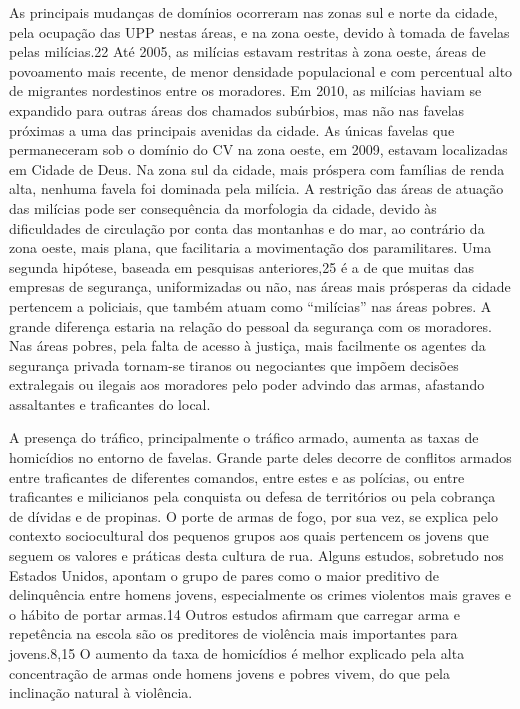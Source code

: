 \documentclass{article}
\begin{document}
As principais mudanças de domínios ocorreram nas zonas sul e norte da cidade,
pela ocupação das UPP nestas áreas, e na zona oeste, devido à tomada de favelas
pelas milícias.22 Até 2005, as milícias estavam restritas à zona oeste, áreas de
povoamento mais recente, de menor densidade populacional e com percentual alto
de migrantes nordestinos entre os moradores. Em 2010, as milícias haviam se
expandido para outras áreas dos chamados subúrbios, mas não nas favelas próximas
a uma das principais avenidas da cidade. As únicas favelas que permaneceram sob
o domínio do CV na zona oeste, em 2009, estavam localizadas em Cidade de Deus.
Na zona sul da cidade, mais próspera com famílias de renda alta, nenhuma favela
foi dominada pela milícia. A restrição das áreas de atuação das milícias pode
ser consequência da morfologia da cidade, devido às dificuldades de circulação
por conta das montanhas e do mar, ao contrário da zona oeste, mais plana, que
facilitaria a movimentação dos paramilitares. Uma segunda hipótese, baseada em
pesquisas anteriores,25 é a de que muitas das empresas de segurança,
uniformizadas ou não, nas áreas mais prósperas da cidade pertencem a policiais,
que também atuam como “milícias” nas áreas pobres. A grande diferença estaria na
relação do pessoal da segurança com os moradores. Nas áreas pobres, pela falta
de acesso à justiça, mais facilmente os agentes da segurança privada tornam-se
tiranos ou negociantes que impõem decisões extralegais ou ilegais aos moradores
pelo poder advindo das armas, afastando assaltantes e traficantes do local.

A presença do tráfico, principalmente o tráfico armado, aumenta as taxas de
homicídios no entorno de favelas. Grande parte deles decorre de conflitos
armados entre traficantes de diferentes comandos, entre estes e as polícias, ou
entre traficantes e milicianos pela conquista ou defesa de territórios ou pela
cobrança de dívidas e de propinas. O porte de armas de fogo, por sua vez, se
explica pelo contexto sociocultural dos pequenos grupos aos quais pertencem os
jovens que seguem os valores e práticas desta cultura de rua. Alguns estudos,
sobretudo nos Estados Unidos, apontam o grupo de pares como o maior preditivo de
delinquência entre homens jovens, especialmente os crimes violentos mais graves
e o hábito de portar armas.14 Outros estudos afirmam que carregar arma e
repetência na escola são os preditores de violência mais importantes para
jovens.8,15 O aumento da taxa de homicídios é melhor explicado pela alta
concentração de armas onde homens jovens e pobres vivem, do que pela inclinação
natural à violência.
\end{document}
